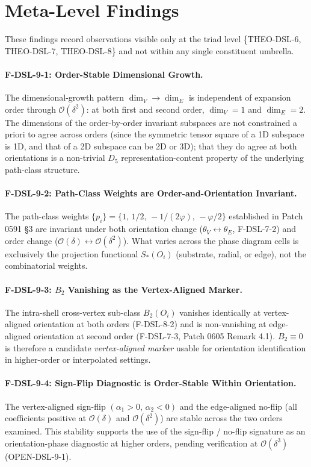 \documentclass[11pt]{article}
\begin{document}
\section{Meta-Level Findings}

These findings record observations visible only at the triad level
\{THEO-DSL-6, THEO-DSL-7, THEO-DSL-8\} and not within any single
constituent umbrella.

\paragraph{F-DSL-9-1: Order-Stable Dimensional Growth.}
The dimensional-growth pattern $\dim_V \to \dim_E$ is independent of
expansion order through $\mathcal{O}(\delta^2)$: at both first and
second order, $\dim_V = 1$ and $\dim_E = 2$. The dimensions of the
order-by-order invariant subspaces are not constrained a priori to
agree across orders (since the symmetric tensor square of a 1D subspace
is 1D, and that of a 2D subspace can be 2D or 3D); that they do agree
at both orientations is a non-trivial $D_5$ representation-content
property of the underlying path-class structure.

\paragraph{F-DSL-9-2: Path-Class Weights are Order-and-Orientation Invariant.}
The path-class weights $\{p_i\} = \{1,\,1/2,\,-1/(2\varphi),\,-\varphi/2\}$
established in Patch 0591 §3 are invariant under both orientation
change ($\theta_V \leftrightarrow \theta_E$, F-DSL-7-2) and order
change ($\mathcal{O}(\delta) \leftrightarrow \mathcal{O}(\delta^2)$).
What varies across the phase diagram cells is exclusively the
projection functional $S_*(O_i)$ (substrate, radial, or edge), not the
combinatorial weights.

\paragraph{F-DSL-9-3: $B_2$ Vanishing as the Vertex-Aligned Marker.}
The intra-shell cross-vertex sub-class $B_2(O_i)$ vanishes identically
at vertex-aligned orientation at both orders (F-DSL-8-2) and is
non-vanishing at edge-aligned orientation at second order
(F-DSL-7-3, Patch 0605 Remark 4.1). $B_2 \equiv 0$ is therefore a
candidate \emph{vertex-aligned marker} usable for orientation
identification in higher-order or interpolated settings.

\paragraph{F-DSL-9-4: Sign-Flip Diagnostic is Order-Stable Within Orientation.}
The vertex-aligned sign-flip $(\alpha_1 > 0,\, \alpha_2 < 0)$ and the
edge-aligned no-flip (all coefficients positive at $\mathcal{O}(\delta)$
and $\mathcal{O}(\delta^2)$) are stable across the two orders examined.
This stability supports the use of the sign-flip / no-flip signature as
an orientation-phase diagnostic at higher orders, pending verification
at $\mathcal{O}(\delta^3)$ (OPEN-DSL-9-1).
\end{document}
